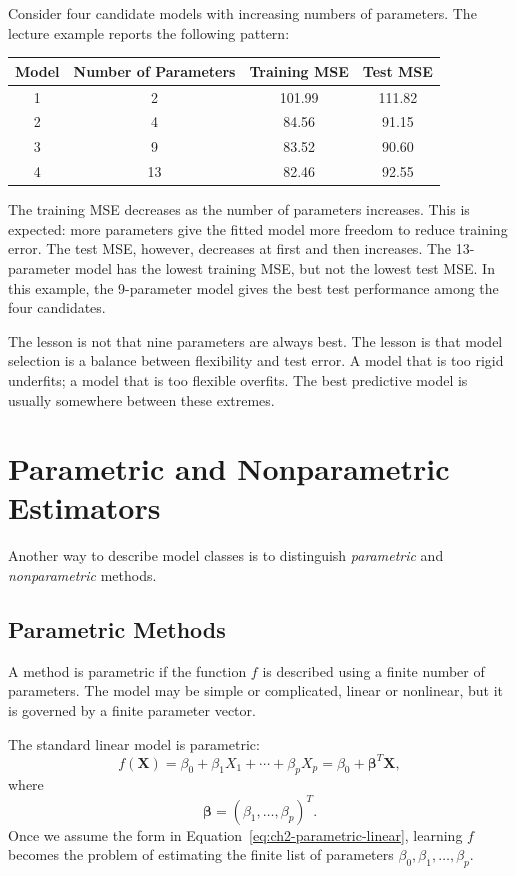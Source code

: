 {Consider four candidate models with increasing numbers of parameters.  The lecture example reports the following pattern:
\begin{center}
\begin{tabular}{c|c|c|c}
\hline
Model & Number of Parameters & Training MSE & Test MSE \\
\hline
1 & 2  & 101.99 & 111.82 \\
2 & 4  & 84.56  & 91.15  \\
3 & 9  & 83.52  & 90.60  \\
4 & 13 & 82.46  & 92.55  \\
\hline
\end{tabular}
\end{center}
The training MSE decreases as the number of parameters increases.  This is expected: more parameters give the fitted model more freedom to reduce training error.  The test MSE, however, decreases at first and then increases.  The 13-parameter model has the lowest training MSE, but not the lowest test MSE.  In this example, the 9-parameter model gives the best test performance among the four candidates.

The lesson is not that nine parameters are always best.  The lesson is that model selection is a balance between flexibility and test error.  A model that is too rigid underfits; a model that is too flexible overfits.  The best predictive model is usually somewhere between these extremes.

\section{Parametric and Nonparametric Estimators}

Another way to describe model classes is to distinguish \emph{parametric} and \emph{nonparametric} methods.

\subsection{Parametric Methods}

A method is parametric if the function $f$ is described using a finite number of parameters.  The model may be simple or complicated, linear or nonlinear, but it is governed by a finite parameter vector.

The standard linear model is parametric:
\begin{equation}
  f(\mathbf{X})
  = \beta_0 + \beta_1X_1+\cdots+\beta_pX_p
  = \beta_0+\boldsymbol{\beta}^T\mathbf{X},
  \label{eq:ch2-parametric-linear}
\end{equation}
where
\[
  \boldsymbol{\beta}=(\beta_1,\ldots,\beta_p)^T.
\]
Once we assume the form in Equation~\eqref{eq:ch2-parametric-linear}, learning $f$ becomes the problem of estimating the finite list of parameters $\beta_0,\beta_1,\ldots,\beta_p$.

}
